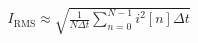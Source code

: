 \documentclass[preview]{standalone}
\begin{document}
\begin{align*}
I_{\mathrm{RMS}} \approx \sqrt{ \frac{1}{N \Delta t} \sum_{n=0}^{N-1} i^2[n] \Delta t }
\end{align*}
\end{document}
